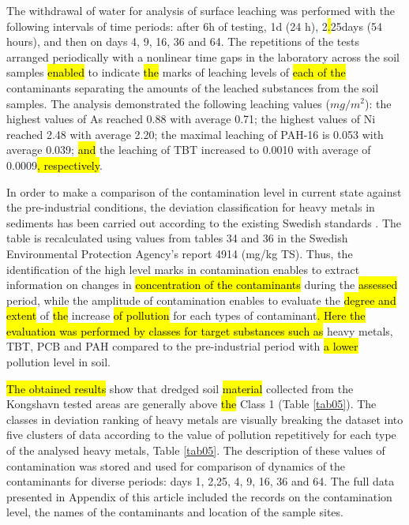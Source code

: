 \documentclass[algorithms,article,submit,pdftex,moreauthors]{Definitions/mdpi}
\begin{document}
The withdrawal of water for analysis of surface leaching was performed with the following intervals of time periods: after 6h of testing, 1d (24 h), 2\hl{.}25days (54 hours), and then on days 4, 9, 16, 36 and 64. The repetitions of the tests arranged periodically with a nonlinear time gaps in the laboratory across the soil samples \hl{enabled} to indicate \hl{the }marks of leaching levels of \hl{each of the }contaminants separating the amounts of the leached substances from the soil samples. The analysis demonstrated the following leaching values ($mg/m^2$): the highest values of As reached 0.88 with average 0.71; the highest values of Ni reached 2.48 with average 2.20; the maximal leaching of PAH-16 is 0.053 with average 0.039; \hl{and }the leaching of TBT increased to 0.0010 with average of 0.0009\hl{, respectively}. 

In order to make a comparison of the contamination level in current state against the pre-industrial conditions, the deviation classification for heavy metals in sediments has been carried out according to the existing Swedish standards \cite{ZefferSamuelsson}. The table is recalculated using values from tables 34 and 36 in the Swedish Environmental Protection Agency's report 4914 (mg/kg TS). Thus, the identification of the high level marks in contamination enables to extract information on changes in \hl{concentration of the contaminants }during the \hl{assessed} period, while the amplitude of contamination enables to evaluate the \hl{degree and extent} of \hl{the }increase \hl{of pollution }for each types of contaminant\hl{. Here the evaluation was performed by classes for target substances such as }heavy metals, TBT, PCB and PAH compared to the pre-industrial period with \hl{a lower} pollution level in soil. 

\hl{The obtained results} show that dredged soil \hl{material} collected from the Kongshavn tested areas are generally above \hl{the }Class 1 (Table \ref{tab05}). The classes in deviation ranking of heavy metals are visually breaking the dataset into five clusters of data according to the value of pollution repetitively for each type of the analysed heavy metals, Table \ref{tab05}. The description of these values of contamination was stored and used for comparison of dynamics of the contaminants for diverse periods: days 1, 2,25, 4, 9, 16, 36 and 64. The full data presented in Appendix of this article included the records on the contamination level, the names of the contaminants and location of the sample sites. 
\end{document}
